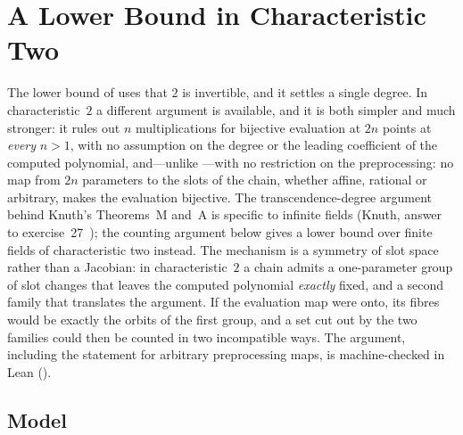 \section{A Lower Bound in Characteristic Two}
\label{sec:lower-char2}

The lower bound of  uses that $2$ is invertible, and it settles a single
degree.  In characteristic~$2$ a different argument is available, and it is both simpler
and much stronger: it rules out $n$ multiplications for bijective evaluation at $2n$
points at \emph{every} $n>1$, with no assumption on the degree or the leading coefficient
of the computed polynomial, and---unlike ---with no restriction on the
preprocessing: no map from $2n$ parameters to the slots of the chain, whether affine,
rational or arbitrary, makes the evaluation bijective.  The transcendence-degree argument
behind Knuth's Theorems~M and~A is specific to infinite fields (Knuth, answer to
exercise~27~\cite[\S4.6.4]{knuth1997seminumerical}); the counting argument below gives a
lower bound over finite fields of characteristic two instead.  The mechanism is a symmetry of
slot space rather than a Jacobian: in characteristic~$2$ a chain admits a one-parameter
group of slot changes that leaves the computed polynomial \emph{exactly} fixed, and a
second family that translates the argument.  If the evaluation map were onto, its fibres
would be exactly the orbits of the first group, and a set cut out by the two families
could then be counted in two incompatible ways.  The argument, including the statement for
arbitrary preprocessing maps, is machine-checked in Lean ().

\subsection{Model}

